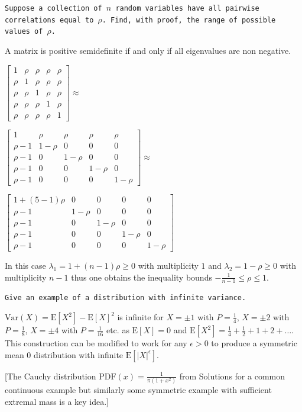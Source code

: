 \texttt{Suppose a collection of $n$ random variables have all pairwise correlations equal to $\rho$. Find, with proof, the range of possible values of $\rho$.}

A matrix is positive semidefinite if and only if all eigenvalues are non negative.

$
\begin{bmatrix}
1 & \rho & \rho & \rho & \rho \\
\rho & 1 & \rho & \rho & \rho \\
\rho & \rho & 1 & \rho & \rho \\
\rho & \rho & \rho & 1 & \rho \\
\rho & \rho & \rho & \rho & 1
\end{bmatrix}
\approx
$

$
\begin{bmatrix}
1 & \rho & \rho & \rho & \rho \\
\rho-1 & 1-\rho & 0 & 0 & 0 \\
\rho-1 & 0 & 1-\rho & 0 & 0 \\
\rho-1 & 0 & 0 & 1-\rho & 0 \\
\rho-1 & 0 & 0 & 0 & 1-\rho
\end{bmatrix}
\approx
$

$
\begin{bmatrix}
1+(5-1)\rho & 0 & 0 & 0 & 0 \\
\rho-1 & 1-\rho & 0 & 0 & 0 \\
\rho-1 & 0 & 1-\rho & 0 & 0 \\
\rho-1 & 0 & 0 & 1-\rho & 0 \\
\rho-1 & 0 & 0 & 0 & 1-\rho
\end{bmatrix}
$

In this case $\lambda_1 = 1+(n-1)\rho \ge 0$ with multiplicity $1$ and $\lambda_2 = 1-\rho \ge 0$ with multiplicity $n-1$ thus one obtains the inequality bounds $\boxed{-\frac{1}{n-1} \le \rho \le 1}$.

\texttt{Give an example of a distribution with infinite variance.}

$\text{Var}(X)=\text{E}[X^2]-\text{E}[X]^2$ is infinite for $X=\pm 1$ with $P=\frac{1}{4}$, $X=\pm 2$ with $P=\frac{1}{8}$, $X=\pm 4$ with $P=\frac{1}{16}$ etc. as $\text{E}[X]=0$ and $\text{E}[X^2]=\frac{1}{4}+\frac{1}{2}+1+2+\dots$. This construction can be modified to work for any $\epsilon >0$ to produce a symmetric mean $0$ distribution with infinite $\text{E}[|X|^{\epsilon}]$.

[The Cauchy distribution $\text{PDF}(x)=\frac{1}{\pi (1+x^2)}$ from Solutions for a common continuous example but similarly some symmetric example with sufficient extremal mass is a key idea.]

